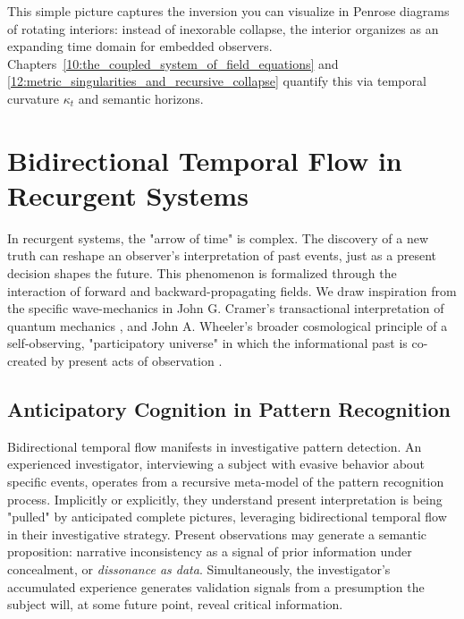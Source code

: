This simple picture captures the inversion you can visualize in Penrose diagrams of rotating interiors: instead of inexorable collapse, the interior organizes as an expanding time domain for embedded observers. Chapters~\ref{10:the_coupled_system_of_field_equations} and \ref{12:metric_singularities_and_recursive_collapse} quantify this via temporal curvature \(\kappa_t\) and semantic horizons.

\section{Bidirectional Temporal Flow in Recurgent Systems}
\label{9.6:bidirectional_temporal_flow_in_recurgent_systems}

In recurgent systems, the "arrow of time" is complex. The discovery of a new truth can reshape an observer's interpretation of past events, just as a present decision shapes the future. This phenomenon is formalized through the interaction of forward and backward-propagating fields. We draw inspiration from the specific wave-mechanics in John G. Cramer's transactional interpretation of quantum mechanics \autocite{Cramer1986}, and John A. Wheeler's broader cosmological principle of a self-observing, "participatory universe" in which the informational past is co-created by present acts of observation \autocite{Wheeler1990}.


\subsection{Anticipatory Cognition in Pattern Recognition}
\label{9.6.1:anticipatory_cognition_in_pattern_recognition}

Bidirectional temporal flow manifests in investigative pattern detection. An experienced investigator, interviewing a subject with evasive behavior about specific events, operates from a recursive meta-model of the pattern recognition process. Implicitly or explicitly, they understand present interpretation is being "pulled" by anticipated complete pictures, leveraging bidirectional temporal flow in their investigative strategy. Present observations may generate a semantic proposition: narrative inconsistency as a signal of prior information under concealment, or \textit{dissonance as data}. Simultaneously, the investigator's accumulated experience generates validation signals from a presumption the subject will, at some future point, reveal critical information.

